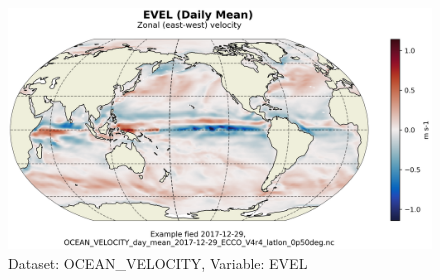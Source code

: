 \begin{figure}[H]
\centering
\includegraphics[scale=0.55]{../images/plots/latlon_plots/Ocean_Velocity/EVEL.png}
\caption{Dataset: OCEAN\_VELOCITY, Variable: EVEL}
\label{tab:table-OCEAN_VELOCITY_EVEL-Plot}
\end{figure}
\pagebreak
